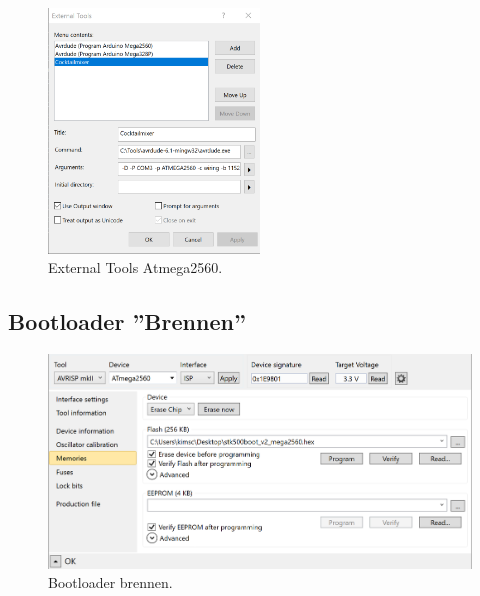 \begin{appendix}
\begin{figure}[h!]
	\centering
	\includegraphics[width=0.5\textwidth]{graphics/AtmelStudio_External_Tools}
	\caption{External Tools Atmega2560.}
	\label{fig:AtmelStudio_Locks}
\end{figure}

\subsection{Bootloader ''Brennen''}

\begin{figure}[h!]
	\centering
	\includegraphics[width=\textwidth]{graphics/AtmelStudio_Program_Bootloader}
	\caption{Bootloader brennen.}
	\label{fig:AtmelStudio_Program_Bootloader}
\end{figure}

\end{appendix}